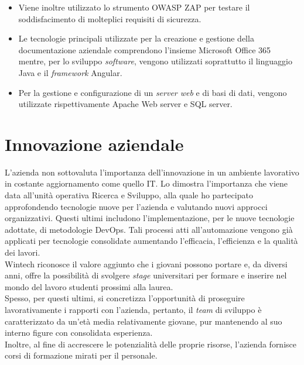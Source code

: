 \begin{itemize}
    \item Viene inoltre utilizzato lo strumento OWASP ZAP per testare il soddisfacimento di molteplici requisiti di sicurezza. 
    \item Le tecnologie principali utilizzate per la creazione e gestione della documentazione aziendale comprendono l'insieme Microsoft Office 365 mentre, per lo sviluppo \emph{software}, vengono utilizzati soprattutto il linguaggio Java e il \emph{framework} Angular. 
    \item Per la gestione e configurazione di un \emph{server web} e di basi di dati, vengono utilizzate rispettivamente Apache Web server e SQL server. 
\end{itemize}

\section{Innovazione aziendale}
L'azienda non sottovaluta l'importanza dell'innovazione in un ambiente lavorativo in costante aggiornamento come quello \gls{IT}. Lo dimostra l'importanza che viene data all'\gls{unità operativa} Ricerca e Sviluppo, alla quale ho partecipato approfondendo tecnologie nuove per l'azienda e valutando nuovi approcci organizzativi. Questi ultimi includono l'implementazione, per le nuove tecnologie adottate, di metodologie \gls{DevOps}. Tali processi atti all'automazione vengono già applicati per tecnologie consolidate aumentando l'efficacia, l'efficienza e la qualità dei lavori.\\
Wintech riconosce il valore aggiunto che i giovani possono portare e, da diversi anni, offre la possibilità di svolgere \emph{stage} universitari per formare e inserire nel mondo del lavoro studenti prossimi alla laurea.\\
Spesso, per questi ultimi, si concretizza l'opportunità di proseguire lavorativamente i rapporti con l'azienda, pertanto, il \emph{team} di sviluppo è caratterizzato da un'età media relativamente giovane, pur mantenendo al suo interno figure con consolidata esperienza.\\ 
Inoltre, al fine di accrescere le potenzialità delle proprie risorse, l'azienda fornisce corsi di formazione mirati per il personale.
